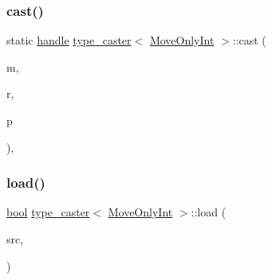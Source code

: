 \subsubsection{\texorpdfstring{cast()}{cast()}}
{\footnotesize\ttfamily static \mbox{\hyperlink{classhandle}{handle}} \mbox{\hyperlink{classtype__caster}{type\+\_\+caster}}$<$ \mbox{\hyperlink{class_move_only_int}{Move\+Only\+Int}} $>$\+::cast (\begin{DoxyParamCaption}\item[{const \mbox{\hyperlink{class_move_only_int}{Move\+Only\+Int}} \&}]{m,  }\item[{\mbox{\hyperlink{detail_2common_8h_adde72ab1fb0dd4b48a5232c349a53841}{return\+\_\+value\+\_\+policy}}}]{r,  }\item[{\mbox{\hyperlink{classhandle}{handle}}}]{p }\end{DoxyParamCaption})\hspace{0.3cm}{\ttfamily [inline]}, {\ttfamily [static]}}

\mbox{\label{structtype__caster_3_01_move_only_int_01_4_ae155ce43235348c9fca79b9fe53a85ed}} 
\subsubsection{\texorpdfstring{load()}{load()}}
{\footnotesize\ttfamily \mbox{\hyperlink{asdl_8h_af6a258d8f3ee5206d682d799316314b1}{bool}} \mbox{\hyperlink{classtype__caster}{type\+\_\+caster}}$<$ \mbox{\hyperlink{class_move_only_int}{Move\+Only\+Int}} $>$\+::load (\begin{DoxyParamCaption}\item[{\mbox{\hyperlink{classhandle}{handle}}}]{src,  }\item[{\mbox{\hyperlink{asdl_8h_af6a258d8f3ee5206d682d799316314b1}{bool}}}]{ }\end{DoxyParamCaption})\hspace{0.3cm}{\ttfamily [inline]}}

\mbox{\label{structtype__caster_3_01_move_only_int_01_4_a924badf99ed675c554353c2be16c78df}} 
